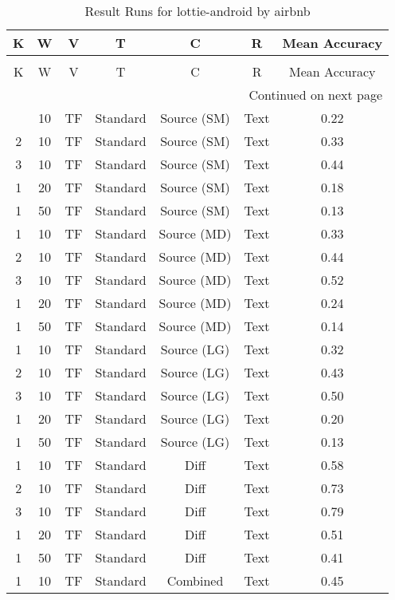 \begin{longtable}{|c|c|c|c|c|c|c|}
\hline
K & W & V & T & C & R & Mean Accuracy \\
\hline
\endfirsthead
\caption[]{Continued from previous page} \\
\hline
K & W & V & T & C & R & Mean Accuracy \\
\hline
\endhead
\hline
\multicolumn{7}{r}{Continued on next page} \\
\endfoot
\hline
\caption{Result Runs for lottie-android by airbnb} 
\label{result-runs-lottie-android-airbnb}
\endlastfoot
1 & 10 & TF & Standard & Source (SM) & Text & 0.22 \\
\hline
2 & 10 & TF & Standard & Source (SM) & Text & 0.33 \\
\hline
3 & 10 & TF & Standard & Source (SM) & Text & 0.44 \\
\hline
1 & 20 & TF & Standard & Source (SM) & Text & 0.18 \\
\hline
1 & 50 & TF & Standard & Source (SM) & Text & 0.13 \\
\hline
1 & 10 & TF & Standard & Source (MD) & Text & 0.33 \\
\hline
2 & 10 & TF & Standard & Source (MD) & Text & 0.44 \\
\hline
3 & 10 & TF & Standard & Source (MD) & Text & 0.52 \\
\hline
1 & 20 & TF & Standard & Source (MD) & Text & 0.24 \\
\hline
1 & 50 & TF & Standard & Source (MD) & Text & 0.14 \\
\hline
1 & 10 & TF & Standard & Source (LG) & Text & 0.32 \\
\hline
2 & 10 & TF & Standard & Source (LG) & Text & 0.43 \\
\hline
3 & 10 & TF & Standard & Source (LG) & Text & 0.50 \\
\hline
1 & 20 & TF & Standard & Source (LG) & Text & 0.20 \\
\hline
1 & 50 & TF & Standard & Source (LG) & Text & 0.13 \\
\hline
1 & 10 & TF & Standard & Diff & Text & 0.58 \\
\hline
2 & 10 & TF & Standard & Diff & Text & 0.73 \\
\hline
3 & 10 & TF & Standard & Diff & Text & 0.79 \\
\hline
1 & 20 & TF & Standard & Diff & Text & 0.51 \\
\hline
1 & 50 & TF & Standard & Diff & Text & 0.41 \\
\hline
1 & 10 & TF & Standard & Combined & Text & 0.45 \\

\end{longtable}
